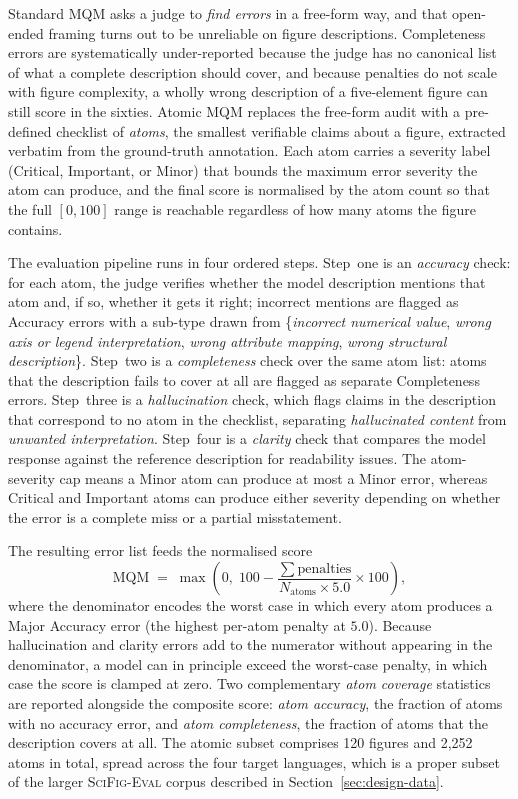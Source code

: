 Standard MQM asks a judge to \emph{find errors} in a free-form
way, and that open-ended framing turns out to be unreliable on
figure descriptions. Completeness errors are systematically
under-reported because the judge has no canonical list of what
a complete description should cover, and because penalties do
not scale with figure complexity, a wholly wrong description of
a five-element figure can still score in the sixties. Atomic
MQM replaces the free-form audit with a pre-defined checklist
of \emph{atoms}, the smallest verifiable claims about a figure,
extracted verbatim from the ground-truth annotation. Each atom
carries a severity label (Critical, Important, or Minor) that
bounds the maximum error severity the atom can produce, and the
final score is normalised by the atom count so that the full
$[0, 100]$ range is reachable regardless of how many atoms the
figure contains.

The evaluation pipeline runs in four ordered steps. Step~one is
an \emph{accuracy} check: for each atom, the judge verifies
whether the model description mentions that atom and, if so,
whether it gets it right; incorrect mentions are flagged as
Accuracy errors with a sub-type drawn from
\{\emph{incorrect numerical value}, \emph{wrong axis or legend
interpretation}, \emph{wrong attribute mapping}, \emph{wrong
structural description}\}. Step~two is a \emph{completeness}
check over the same atom list: atoms that the description fails
to cover at all are flagged as separate Completeness errors.
Step~three is a \emph{hallucination} check, which flags claims
in the description that correspond to no atom in the checklist,
separating \emph{hallucinated content} from \emph{unwanted
interpretation}. Step~four is a \emph{clarity} check that
compares the model response against the reference description
for readability issues. The atom-severity cap means a Minor
atom can produce at most a Minor error, whereas Critical and
Important atoms can produce either severity depending on
whether the error is a complete miss or a partial misstatement.

The resulting error list feeds the normalised score
\[
  \mathrm{MQM} \;=\; \max\!\left(0,\; 100 - \frac{\sum \mathrm{penalties}}{N_{\mathrm{atoms}} \times 5.0} \times 100\right),
\]
where the denominator encodes the worst case in which every
atom produces a Major Accuracy error (the highest per-atom
penalty at $5.0$). Because hallucination and clarity errors add
to the numerator without appearing in the denominator, a model
can in principle exceed the worst-case penalty, in which case
the score is clamped at zero. Two complementary \emph{atom
coverage} statistics are reported alongside the composite
score: \emph{atom accuracy}, the fraction of atoms with no
accuracy error, and \emph{atom completeness}, the fraction of
atoms that the description covers at all. The atomic subset
comprises 120 figures and 2{,}252 atoms in total, spread across
the four target languages, which is a proper subset of the
larger \textsc{SciFig-Eval} corpus described in
Section~\ref{sec:design-data}.

